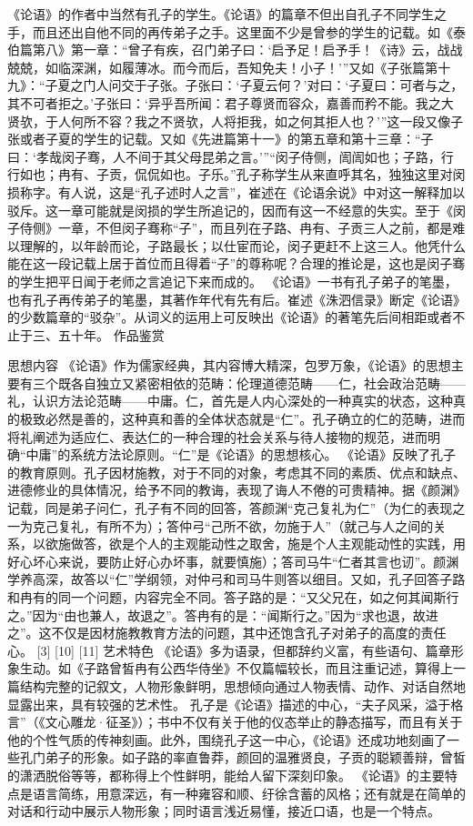 \documentclass[a4paper,12pt,UTF8,twoside]{ctexbook}
\begin{document}
《论语》的作者中当然有孔子的学生。《论语》的篇章不但出自孔子不同学生之手，而且还出自他不同的再传弟子之手。这里面不少是曾参的学生的记载。如《泰伯篇第八》第一章：“曾子有疾，召门弟子曰：‘启予足！启予手！《诗》云，战战兢兢，如临深渊，如履薄冰。而今而后，吾知免夫！小子！’”又如《子张篇第十九》：“子夏之门人问交于子张。子张曰：‘子夏云何？’对曰：‘子夏曰：可者与之，其不可者拒之。’子张曰：‘异乎吾所闻：君子尊贤而容众，嘉善而矜不能。我之大贤欤，于人何所不容？我之不贤欤，人将拒我，如之何其拒人也？’”这一段又像子张或者子夏的学生的记载。又如《先进篇第十一》的第五章和第十三章：“子曰：‘孝哉闵子骞，人不间于其父母昆弟之言。’”“闵子侍侧，訚訚如也；子路，行行如也；冉有、子贡，侃侃如也。子乐。”孔子称学生从来直呼其名，独独这里对闵损称字。有人说，这是“孔子述时人之言”，崔述在《论语余说》中对这一解释加以驳斥。这一章可能就是闵损的学生所追记的，因而有这一不经意的失实。至于《闵子侍侧》一章，不但闵子骞称“子”，而且列在子路、冉有、子贡三人之前，都是难以理解的，以年龄而论，子路最长；以仕宦而论，闵子更赶不上这三人。他凭什么能在这一段记载上居于首位而且得着“子”的尊称呢？合理的推论是，这也是闵子骞的学生把平日闻于老师之言追记下来而成的。
《论语》一书有孔子弟子的笔墨，也有孔子再传弟子的笔墨，其著作年代有先有后。崔述《洙泗信录》断定《论语》的少数篇章的“驳杂”。从词义的运用上可反映出《论语》的著笔先后间相距或者不止于三、五十年。
作品鉴赏

思想内容
《论语》作为儒家经典，其内容博大精深，包罗万象，《论语》的思想主要有三个既各自独立又紧密相依的范畴：伦理道德范畴——仁，社会政治范畴——礼，认识方法论范畴——中庸。仁，首先是人内心深处的一种真实的状态，这种真的极致必然是善的，这种真和善的全体状态就是“仁”。孔子确立的仁的范畴，进而将礼阐述为适应仁、表达仁的一种合理的社会关系与待人接物的规范，进而明确“中庸”的系统方法论原则。“仁”是《论语》的思想核心。
《论语》反映了孔子的教育原则。孔子因材施教，对于不同的对象，考虑其不同的素质、优点和缺点、进德修业的具体情况，给予不同的教诲，表现了诲人不倦的可贵精神。据《颜渊》记载，同是弟子问仁，孔子有不同的回答，答颜渊“克己复礼为仁”（为仁的表现之一为克己复礼，有所不为）；答仲弓“己所不欲，勿施于人”（就己与人之间的关系，以欲施做答，欲是个人的主观能动性之取舍，施是个人主观能动性的实践，用好心坏心来说，要防止好心办坏事，就要慎施）；答司马牛“仁者其言也讱”。颜渊学养高深，故答以“仁”学纲领，对仲弓和司马牛则答以细目。又如，孔子回答子路和冉有的同一个问题，内容完全不同。答子路的是：“又父兄在，如之何其闻斯行之。”因为“由也兼人，故退之”。答冉有的是：“闻斯行之。”因为“求也退，故进之”。这不仅是因材施教教育方法的问题，其中还饱含孔子对弟子的高度的责任心。 [3]
[10] [11]
艺术特色
《论语》多为语录，但都辞约义富，有些语句、篇章形象生动。如《子路曾皙冉有公西华侍坐》不仅篇幅较长，而且注重记述，算得上一篇结构完整的记叙文，人物形象鲜明，思想倾向通过人物表情、动作、对话自然地显露出来，具有较强的艺术性。
孔子是《论语》描述的中心，“夫子风采，溢于格言”（《文心雕龙·征圣》）；书中不仅有关于他的仪态举止的静态描写，而且有关于他的个性气质的传神刻画。此外，围绕孔子这一中心，《论语》还成功地刻画了一些孔门弟子的形象。如子路的率直鲁莽，颜回的温雅贤良，子贡的聪颖善辩，曾皙的潇洒脱俗等等，都称得上个性鲜明，能给人留下深刻印象。
《论语》的主要特点是语言简练，用意深远，有一种雍容和顺、纡徐含蓄的风格；还有就是在简单的对话和行动中展示人物形象；同时语言浅近易懂，接近口语，也是一个特点。 
\end{document}
